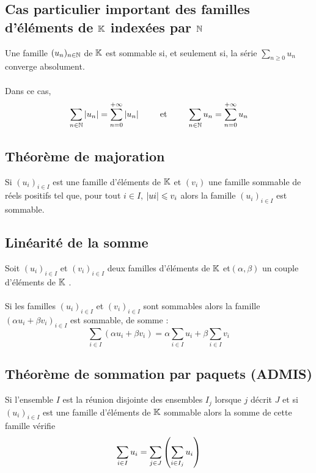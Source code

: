 \subsection{Cas particulier important des familles d’éléments de \(\mathbb{K}\)   indexées par \(\mathbb{N}\)}
\begin{defprop}
    Une famille \((u_n)_{n\in \mathbb{N}}\) de \(\mathbb{K}\) est sommable si, et seulement si, la série \(\sum_{n \geq 0} u_n\) converge absolument.\\~\\
    Dans ce cas,
    \[\sum_{n\in \mathbb{N}}\left\lvert u_n\right\rvert = \sum^{+\infty}_{n=0}\left\lvert u_n\right\rvert\qquad \text{ et } \qquad \sum_{n\in \mathbb{N}}u_n = \sum^{+\infty}_{n=0}u_n\]
\end{defprop}
\subsection{Théorème de majoration}
\begin{defprop}
    Si \((u_i)_{i\in I}\) est une famille d’éléments de \(\mathbb{K}\)   et \((v_i)\) une famille sommable de réels positifs tel que, pour tout \(i \in  I\), \(\left\lvert ui\right\rvert \leqslant v_i\) alors la famille \((u_i)_{i\in I}\) est sommable.
\end{defprop}
\subsection{Linéarité de la somme}
\begin{defprop}
    Soit \((u_i)_{i\in I}\) et \((v_i)_{i\in I}\) deux familles d’éléments de \(\mathbb{K} \)  et\( (\alpha , \beta)\) un couple d’éléments de \(\mathbb{K}\)  .\\~\\
    Si les familles \((u_i)_{i\in I}\) et \((v_i)_{i\in I}\) sont sommables alors la famille \((\alpha u_i + \beta v_i)_{i\in I}\) est sommable, de somme :
    \[\sum_{i\in I}(\alpha u_i + \beta v_i) = \alpha \sum_{i\in I}u_i + \beta \sum_{i\in I}v_i\]
\end{defprop}
\subsection{Théorème de sommation par paquets (ADMIS)}
\begin{theo}
    Si l’ensemble \(I\) est la réunion disjointe des ensembles \(I_j\) lorsque \(j\) décrit \(J\) et si \((u_i)_{i\in I}\) est une famille d’éléments de \(\mathbb{K}\) sommable alors la somme de cette famille vérifie
    \[\sum_{i\in I}u_i = \sum_{j\in J}\left(\sum_{i\in I_j} u_i\right)\]
\end{theo}

